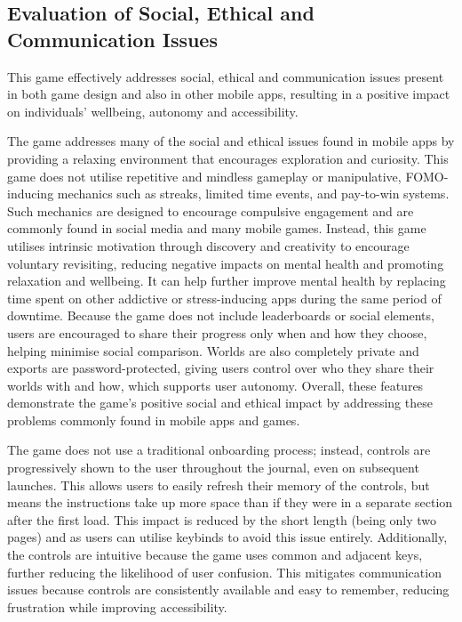 \documentclass[14pt]{article}
\begin{document}
\subsection{Evaluation of Social, Ethical and Communication Issues}
This game effectively addresses social, ethical and communication issues present in both game design and also in other mobile apps, resulting in a positive impact on individuals' wellbeing, autonomy and accessibility.

The game addresses many of the social and ethical issues found in mobile apps by providing a relaxing environment that encourages exploration and curiosity.
This game does not utilise repetitive and mindless gameplay or manipulative, FOMO-inducing mechanics such as streaks, limited time events, and pay-to-win systems.
Such mechanics are designed to encourage compulsive engagement and are commonly found in social media and many mobile games.
Instead, this game utilises intrinsic motivation through discovery and creativity to encourage voluntary revisiting, reducing negative impacts on mental health and promoting relaxation and wellbeing.
It can help further improve mental health by replacing time spent on other addictive or stress-inducing apps during the same period of downtime.
Because the game does not include leaderboards or social elements, users are encouraged to share their progress only when and how they choose, helping minimise social comparison.
Worlds are also completely private and exports are password-protected, giving users control over who they share their worlds with and how, which supports user autonomy.
Overall, these features demonstrate the game's positive social and ethical impact by addressing these problems commonly found in mobile apps and games.

The game does not use a traditional onboarding process; instead, controls are progressively shown to the user throughout the journal, even on subsequent launches.
This allows users to easily refresh their memory of the controls, but means the instructions take up more space than if they were in a separate section after the first load.
This impact is reduced by the short length (being only two pages) and as users can utilise keybinds to avoid this issue entirely.
Additionally, the controls are intuitive because the game uses common and adjacent keys, further reducing the likelihood of user confusion.
This mitigates communication issues because controls are consistently available and easy to remember, reducing frustration while improving accessibility.
\end{document}
